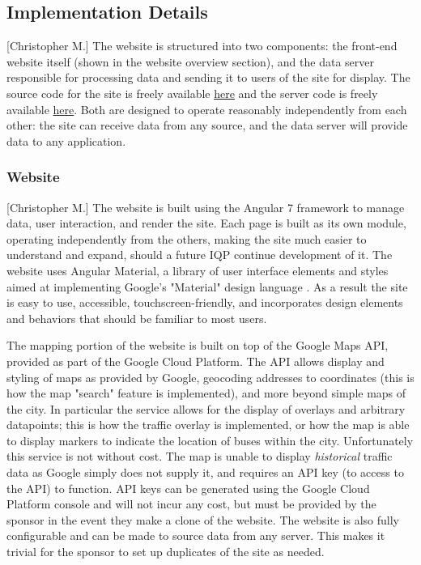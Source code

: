 \documentclass[12pt]{article}                               %
\begin{document}
\subsection{Implementation Details}[Christopher M.]
The website is structured into two components: the front-end website itself (shown in the website overview section), and the data server responsible for processing data and sending it to users of the site for display. The source code for the site is freely available \href{https://github.com/c7c8/Eilat-Transport-Map-Site}{here} and the server code is freely available \href{https://github.com/c7c8/Eilat-Transport-Map-Server}{here}. Both are designed to operate reasonably independently from each other: the site can receive data from any source, and the data server will provide data to any application.

\subsubsection{Website}[Christopher M.]
The website is built using the Angular 7 framework to manage data, user interaction, and render the site. Each page is built as its own module, operating independently from the others, making the site much easier to understand and expand, should a future IQP continue development of it. The website uses Angular Material, a library of user interface elements and styles aimed at implementing Google's "Material" design language \cite{Google2019}. As a result the site is easy to use, accessible, touchscreen-friendly, and incorporates design elements and behaviors that should be familiar to most users.

The mapping portion of the website is built on top of the Google Maps API, provided as part of the Google Cloud Platform. The API allows display and styling of maps as provided by Google, geocoding addresses to coordinates (this is how the map "search" feature is implemented), and more beyond simple maps of the city. In particular the service allows for the display of overlays and arbitrary datapoints; this is how the traffic overlay is implemented, or how the map is able to display markers to indicate the location of buses within the city. Unfortunately this service is not without cost. The map is unable to display \textit{historical} traffic data as Google simply does not supply it, and requires an API key (to access to the API) to function. API keys can be generated using the Google Cloud Platform console and will not incur any cost, but must be provided by the sponsor in the event they make a clone of the website. The website is also fully configurable and can be made to source data from any server. This makes it trivial for the sponsor to set up duplicates of the site as needed.
\end{document}
